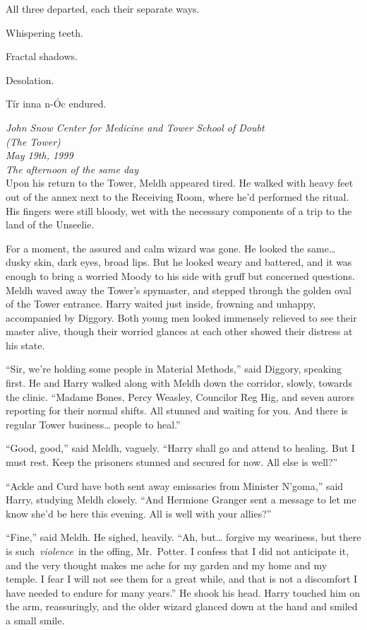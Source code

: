 All three departed, each their separate ways.

Whispering teeth.

Fractal shadows.

Desolation.

Tír inna n-Óc endured.

\mybreak

\emph{John Snow Center for Medicine and Tower School of Doubt\\
(The Tower)}\\
\emph{May 19th, 1999}\\
\emph{The afternoon of the same day}\\

Upon his return to the Tower, Meldh appeared tired. He walked with heavy
feet out of the annex next to the Receiving Room, where he'd performed
the ritual. His fingers were still bloody, wet with the necessary
components of a trip to the land of the Unseelie.

For a moment, the assured and calm wizard was gone. He looked the
same\ldots{} dusky skin, dark eyes, broad lips. But he looked weary and
battered, and it was enough to bring a worried Moody to his side with
gruff but concerned questions. Meldh waved away the Tower's spymaster,
and stepped through the golden oval of the Tower entrance. Harry waited
just inside, frowning and unhappy, accompanied by Diggory. Both young
men looked immensely relieved to see their master alive, though their
worried glances at each other showed their distress at his state.

``Sir, we're holding some people in Material Methods,'' said Diggory,
speaking first. He and Harry walked along with Meldh down the corridor,
slowly, towards the clinic. ``Madame Bones, Percy Weasley, Councilor Reg
Hig, and seven aurors reporting for their normal shifts. All stunned and
waiting for you. And there is regular Tower business\ldots{} people to
heal.''

``Good, good,'' said Meldh, vaguely. ``Harry shall go and attend to
healing. But I must rest. Keep the prisoners stunned and secured for
now. All else is well?''

``Ackle and Curd have both sent away emissaries from Minister N'goma,''
said Harry, studying Meldh closely. ``And Hermione Granger sent a
message to let me know she'd be here this evening. All is well with your
allies?''

``Fine,'' said Meldh. He sighed, heavily. ``Ah, but\ldots{} forgive my
weariness, but there is such~\emph{violence}~in the offing, Mr.~Potter.
I confess that I did not anticipate it, and the very thought makes me
ache for my garden and my home and my temple. I fear I will not see them
for a great while, and that is not a discomfort I have needed to endure
for many years.'' He shook his head. Harry touched him on the arm,
reassuringly, and the older wizard glanced down at the hand and smiled a
small smile.

